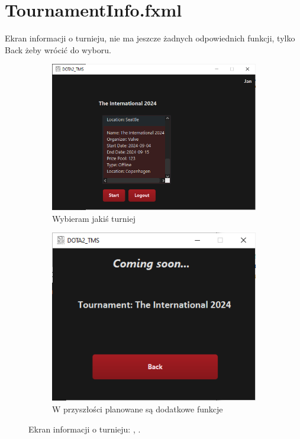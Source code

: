 \section{TournamentInfo.fxml}
Ekran informacji o turnieju, nie ma jeszcze żadnych odpowiednich funkcji, tylko Back żeby wrócić do wyboru.
\begin{figure}[H]
    \begin{subfigure}{0.6\textwidth}
        \centering
        \includegraphics[width=.8\linewidth]{figures/Chosen.png}
        \caption{Wybieram jakiś turniej \label{subfigure_name}}
    \end{subfigure}
    \begin{subfigure}{0.6\textwidth}
        \centering
        \includegraphics[width=.7\linewidth]{figures/Info.png}
        \caption{W przyszłości planowane są dodatkowe funkcje \label{fig:tournament_selection_fxml_edit}}
    \end{subfigure}
    \caption{Ekran informacji o turnieju: \protect{}, \protect{}. \label{fig:tournament_selection_fxml_edit_form}}
\end{figure}
